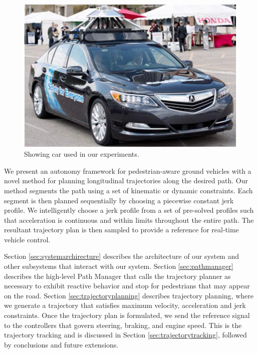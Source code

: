 \documentclass[letterpaper, 10 pt, conference]{ieeeconf}  %
\begin{document}
\begin{figure}[tb]
  \centering
  \includegraphics[width=0.7\columnwidth]{graphics/its_car.png}
  \caption{
    Showing car used in our experiments.
  }
  \label{fig:car}
\end{figure}

We present an autonomy framework for pedestrian-aware ground vehicles
with a novel method for planning longitudinal trajectories 
along the desired path. %
Our method segments the path using a set of kinematic or dynamic constraints.
Each segment is then planned sequentially by choosing a piecewise constant jerk profile.
We intelligently choose a jerk profile from a set of pre-solved profiles such that acceleration is continuous and within limits throughout the entire path.
The resultant trajectory plan is then sampled to provide a reference for real-time vehicle control. %

Section \ref{sec:systemarchirecture} describes the architecture of our system and 
other subsystems that interact with our system.
Section \ref{sec:pathmanager} describes the high-level Path Manager that calls the trajectory planner as necessary to 
exhibit reactive behavior and stop for pedestrians that may appear on the road.
Section \ref{sec:trajectoryplanning} describes trajectory planning, where we generate a trajectory that satisfies maximum velocity, acceleration and jerk constraints. 
Once the trajectory plan is formulated, we send the reference signal to the controllers that govern steering, braking, and engine speed.
This is the trajectory tracking and is discussed in Section \ref{sec:trajectorytracking},
followed by conclusions and future extensions.
\end{document}
